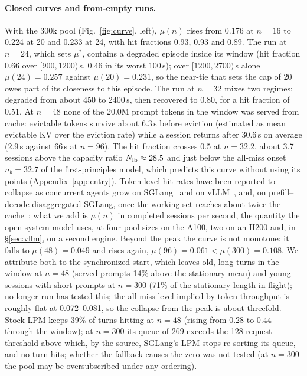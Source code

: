 \paragraph{Closed curves and from-empty runs.}
With the 300k pool (Fig.~\ref{fig:curve}, left), $\mu(n)$ rises from 0.176\sps{} at $n=16$ to 0.224 at 20 and 0.233 at 24, with hit fractions 0.93, 0.93 and 0.89. The run at $n=24$, which sets $\mu^*$, contains a degraded episode inside its window (hit fraction 0.66 over $[900,1200)$\,s, 0.46 in its worst 100\,s); over $[1200,2700)$\,s alone $\mu(24)=0.257$ against $\mu(20)=0.231$, so the near-tie that sets the cap of 20 owes part of its closeness to this episode. The run at $n=32$ mixes two regimes: degraded from about 450 to 2400\,s, then recovered to 0.80, for a hit fraction of 0.51. At $n=48$ none of the 20.0M prompt tokens in the window was served from cache: evictable tokens survive about 6.3\,s before eviction (estimated as mean evictable KV over the eviction rate) while a session returns after 30.6\,s on average (2.9\,s against 66\,s at $n=96$). The hit fraction crosses 0.5 at $n=32.2$, about 3.7 sessions above the capacity ratio $N_{\mathrm{lb}}\approx28.5$ and just below the all-miss onset $n_b=32.7$ of the first-principles model, which predicts this curve without using its points (Appendix~\ref{app:entry}). Token-level hit rates have been reported to collapse as concurrent agents grow on SGLang~\citep{chen2026concur} and on vLLM~\citep{yuan2026agentic,hong2026misat}, and, on prefill--decode disaggregated SGLang, once the working set reaches about twice the cache~\citep{lu2026cachetrap}; what we add is $\mu(n)$ in completed sessions per second, the quantity the open-system model uses, at four pool sizes on the A100, two on an H200 and, in \S\ref{sec:vllm}, on a second engine. Beyond the peak the curve is not monotone: it falls to $\mu(48)=0.049$\sps{} and rises again, $\mu(96)=0.061<\mu(300)=0.108$\sps. We attribute both to the synchronized start, which leaves old, long turns in the window at $n=48$ (served prompts 14\% above the stationary mean) and young sessions with short prompts at $n=300$ (71\% of the stationary length in flight); no longer run has tested this; the all-miss level implied by token throughput is roughly flat at 0.072--0.081\sps, so the collapse from the peak is about threefold. Stock LPM keeps 39\% of turns hitting at $n=48$ (rising from 0.28 to 0.44 through the window); at $n=300$ its queue of 269 exceeds the 128-request threshold above which, by the source, SGLang's LPM stops re-sorting its queue, and no turn hits; whether the fallback causes the zero was not tested (at $n=300$ the pool may be oversubscribed under any ordering).

